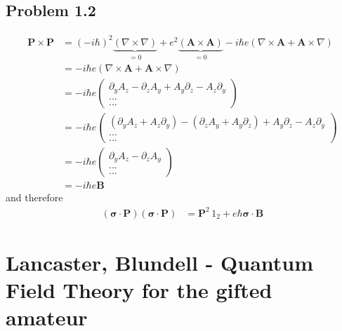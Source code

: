 \documentclass[../main.tex]{subfiles}
\begin{document}
\subsection{Problem 1.2}
\begin{align}
\mathbf{P}\times\mathbf{P}
&=(-i\hbar)^2\underbrace{(\nabla\times\nabla)}_{=0}+e^2\underbrace{(\mathbf{A}\times\mathbf{A})}_{=0}-i\hbar e(\nabla\times\mathbf{A}+\mathbf{A}\times\nabla)\\
&=-i\hbar e(\nabla\times\mathbf{A}+\mathbf{A}\times\nabla)\\
&=-i\hbar e\left(\begin{matrix}
\partial_yA_z-\partial_zA_y+A_y\partial_z-A_z\partial_y\\
...\\
...
\end{matrix}\right)\\
&=-i\hbar e\left(\begin{matrix}
(\partial_yA_z+A_z\partial_y)-(\partial_zA_y+A_y\partial_z)+A_y\partial_z-A_z\partial_y\\
...\\
...
\end{matrix}\right)\\
&=-i\hbar e\left(\begin{matrix}
\partial_yA_z-\partial_zA_y\\
...\\
...
\end{matrix}\right)\\
&=-i\hbar e\mathbf{B}
\end{align}
and therefore
\begin{align}
(\mathbf{\sigma}\cdot\mathbf{P})(\mathbf{\sigma}\cdot\mathbf{P})
&=\mathbf{P}^2\,1_2+e\hbar\mathbf{\sigma}\cdot\mathbf{B}
\end{align}

\section{{\sc Lancaster, Blundell} - Quantum Field Theory for the gifted amateur}
\end{document}
